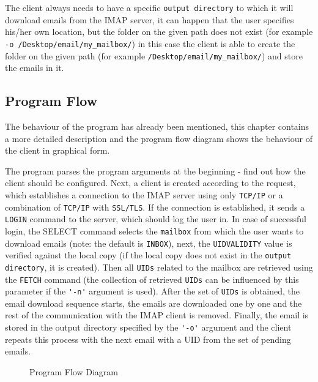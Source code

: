\documentclass[a4paper,11pt]{article}
\begin{document}
\smallskip

The client always needs to have a specific \verb!output directory! to which it will download emails 
from the IMAP server, it can happen that the user specifies his/her own location, but the 
folder on the given path does not exist (for example \verb!-o /Desktop/email/my_mailbox/!) in 
this case the client is able to create the folder on the given path 
(for example \verb!/Desktop/email/my_mailbox/!) and store the emails in it.


\newpage

\subsection{Program Flow}
The behaviour of the program has already been mentioned, this chapter contains a more detailed 
description and the program flow diagram shows the behaviour of the client in graphical form.

The program parses the program arguments at the beginning - find out how the client should be 
configured. Next, a client is created according to the request, which establishes a connection 
to the IMAP server using only \verb!TCP/IP! or a combination of \verb!TCP/IP! with \verb!SSL/TLS!.
If the connection is established, it sends a \verb!LOGIN! command to the server, which should log 
the user in. In case of successful login, the SELECT command selects the \verb!mailbox! from which 
the user wants to download emails (note: the default is \verb!INBOX!), next, the \verb!UIDVALIDITY! 
value is verified against the local copy (if the local copy does not exist in the 
\verb!output directory!, it is created). Then all \verb!UIDs! related to the mailbox are retrieved using 
the \verb!FETCH! command (the collection of retrieved \verb!UIDs! can be influenced by this parameter if the 
\verb!'-n'! argument is used). After the set of \verb!UIDs! is obtained, the email download sequence 
starts, the emails are downloaded one by one and the rest of the communication with the IMAP 
client is removed. Finally, the email is stored in the output directory specified by the 
\verb!'-o'! argument and the client repeats this process with the next email with a UID from 
the set of pending emails.

\begin{figure}[H]
    \centering
    \caption{Program Flow Diagram}
    \label{figure:program-flow-diagram}
\end{figure}
\end{document}

